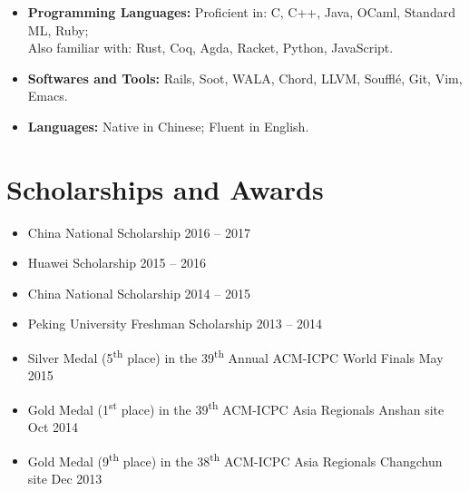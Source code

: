 \documentclass[11pt,letterpaper,sans]{moderncv}        %
\makeatletter
\renewcommand*{\bibliographyitemlabel}{\@biblabel{\arabic{enumiv}}}
\makeatother
\begin{document}
\begin{itemize}

\item \textbf{Programming Languages:} Proficient in: C, C++, Java, OCaml, Standard ML, Ruby; \\ Also familiar with: Rust, Coq, Agda, Racket, Python, JavaScript.

\vspace{5pt}

\item \textbf{Softwares and Tools:} Rails, Soot, WALA, Chord, LLVM, Souffl{\'e}, Git, Vim, Emacs.

\vspace{5pt}

\item \textbf{Languages:} Native in Chinese; Fluent in English.

\end{itemize}

\section{Scholarships and Awards}

\begin{itemize}
	\item China National Scholarship \hfill 2016 -- 2017
	\item Huawei Scholarship \hfill 2015 -- 2016
	\item China National Scholarship \hfill 2014 -- 2015
	\item Peking University Freshman Scholarship \hfill 2013 -- 2014
	
	\vspace{5pt}
	
	\item Silver Medal (5\textsuperscript{th} place) in the 39\textsuperscript{th} Annual ACM-ICPC World Finals \hfill May 2015
	\item Gold Medal (1\textsuperscript{st} place) in the 39\textsuperscript{th} ACM-ICPC Asia Regionals Anshan site \hfill Oct 2014
	\item Gold Medal (9\textsuperscript{th} place) in the 38\textsuperscript{th} ACM-ICPC Asia Regionals Changchun site \hfill Dec 2013
\end{itemize}

%
\end{document}
